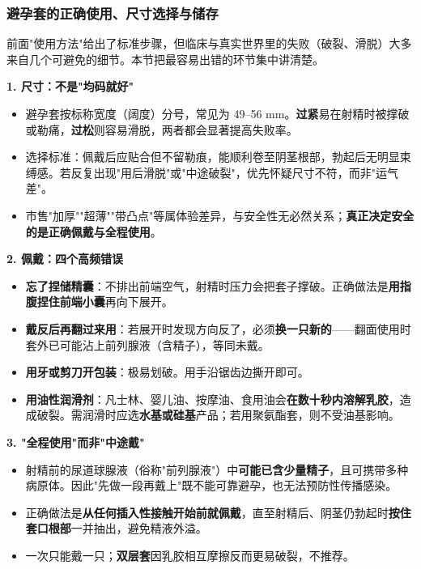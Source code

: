 \subsubsection{避孕套的正确使用、尺寸选择与储存}

前面"使用方法"给出了标准步骤，但临床与真实世界里的失败（破裂、滑脱）大多来自几个可避免的细节。本节把最容易出错的环节集中讲清楚。

\vspace{0.5em}
\noindent\textbf{1. 尺寸：不是"均码就好"}

\begin{itemize}
	\item 避孕套按标称宽度（阔度）分号，常见为 49--56 mm。\textbf{过紧}易在射精时被撑破或勒痛，\textbf{过松}则容易滑脱，两者都会显著提高失败率。
	\item 选择标准：佩戴后应贴合但不留勒痕，能顺利卷至阴茎根部，勃起后无明显束缚感。若反复出现"用后滑脱"或"中途破裂"，优先怀疑尺寸不符，而非"运气差"。
	\item 市售"加厚""超薄""带凸点"等属体验差异，与安全性无必然关系；\textbf{真正决定安全的是正确佩戴与全程使用}。
\end{itemize}

\noindent\textbf{2. 佩戴：四个高频错误}

\begin{itemize}
	\item \textbf{忘了捏储精囊}：不排出前端空气，射精时压力会把套子撑破。正确做法是\textbf{用指腹捏住前端小囊}再向下展开。
	\item \textbf{戴反后再翻过来用}：若展开时发现方向反了，必须\textbf{换一只新的}——翻面使用时套外已可能沾上前列腺液（含精子），等同未戴。
	\item \textbf{用牙或剪刀开包装}：极易划破。用手沿锯齿边撕开即可。
	\item \textbf{用油性润滑剂}：凡士林、婴儿油、按摩油、食用油会\textbf{在数十秒内溶解乳胶}，造成破裂。需润滑时应选\textbf{水基或硅基}产品；若用聚氨酯套，则不受油基影响。
\end{itemize}

\noindent\textbf{3. "全程使用"而非"中途戴"}

\begin{itemize}
	\item 射精前的尿道球腺液（俗称"前列腺液"）中\textbf{可能已含少量精子}，且可携带多种病原体。因此"先做一段再戴上"既不能可靠避孕，也无法预防性传播感染。
	\item 正确做法是\textbf{从任何插入性接触开始前就佩戴}，直至射精后、阴茎仍勃起时\textbf{按住套口根部}一并抽出，避免精液外溢。
	\item 一次只能戴一只；\textbf{双层套}因乳胶相互摩擦反而更易破裂，不推荐。
\end{itemize}

